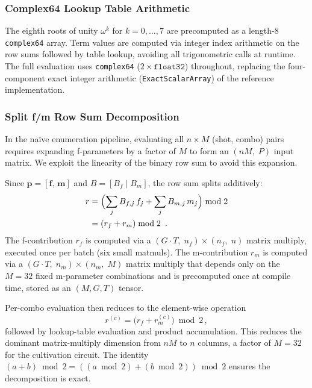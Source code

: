 \documentclass[a4paper,onecolumn,11pt,accepted=2026-06-10]{quantumarticle}
\begin{document}
\subsubsection{Complex64 Lookup Table Arithmetic}
\label{sec:lut}

The eighth roots of unity $\omega^k$ for $k = 0,\ldots,7$ are precomputed as a length-8 \texttt{complex64} array. Term values are computed via integer index arithmetic on the row sums followed by table lookup, avoiding all trigonometric calls at runtime. The full evaluation uses \texttt{complex64} ($2\times\texttt{float32}$) throughout, replacing the four-component exact integer arithmetic (\texttt{ExactScalarArray}) of the reference implementation.

\subsubsection{Split f/m Row Sum Decomposition}
\label{sec:split-fm}

In the na\"ive enumeration pipeline, evaluating all $n \times M$ (shot, combo) pairs requires expanding f-parameters by a factor of $M$ to form an $(nM,\; P)$ input matrix. We exploit the linearity of the binary row sum to avoid this expansion.

Since $\mathbf{p} = [\mathbf{f},\, \mathbf{m}]$ and $B = [B_f \mid B_m]$, the row sum splits additively:
\begin{equation}
    \label{eq:split}
\begin{split}
    r & = \Bigl(\sum_j B_{f,j}\, f_j + \sum_j B_{m,j}\, m_j\Bigr) \bmod 2 \\
      & = (r_f + r_m) \bmod 2\, \ .
\end{split}
\end{equation}
The f-contribution $r_f$ is computed via a $(G \!\cdot\! T,\; n_f) \times (n_f,\; n)$ matrix multiply, executed once per batch (six small matmuls). The m-contribution $r_m$ is computed via a $(G \!\cdot\! T,\; n_m) \times (n_m,\; M)$ matrix multiply that depends only on the $M = 32$ fixed m-parameter combinations and is precomputed once at compile time, stored as an $(M, G, T)$ tensor.

Per-combo evaluation then reduces to the element-wise operation
\begin{equation}
    r^{(c)} = \bigl(r_f + r_m^{(c)}\bigr) \bmod 2\,,
\end{equation}
followed by lookup-table evaluation and product accumulation. This reduces the dominant matrix-multiply dimension from $nM$ to $n$ columns, a factor of $M = 32$ for the cultivation circuit. The identity $(a + b) \bmod 2 = ((a \bmod 2) + (b \bmod 2)) \bmod 2$ ensures the decomposition is exact.
\end{document}
